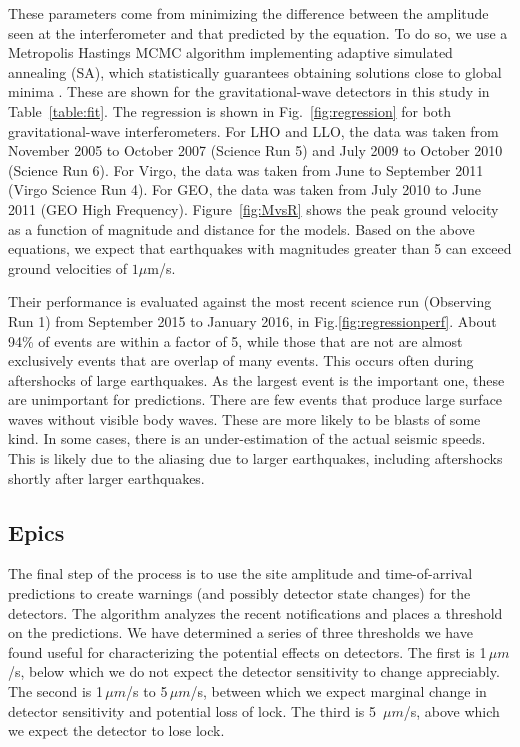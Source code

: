 \documentclass[reprint, prl, aps, showpacs]{revtex4-1}
\begin{document}
These parameters come from minimizing the difference between the amplitude seen at the interferometer and that predicted by the equation. 
To do so, we use a Metropolis Hastings MCMC algorithm implementing adaptive simulated annealing (SA), which statistically guarantees obtaining solutions close to global minima \cite{KiGe1983,In2000}.
These are shown for the gravitational-wave detectors in this study in Table~\ref{table:fit}. The regression is shown in Fig.~\ref{fig:regression} for both gravitational-wave interferometers. 
For LHO and LLO, the data was taken from November 2005 to October 2007 (Science Run 5) and July 2009 to October 2010 (Science Run 6).
For Virgo, the data was taken from June to September 2011 (Virgo Science Run 4).
For GEO, the data was taken from July 2010 to June 2011 (GEO High Frequency).
Figure~\ref{fig:MvsR} shows the peak ground velocity as a function of magnitude and distance for the models. Based on the above equations, we expect that earthquakes with magnitudes greater than 5 can exceed ground velocities of $1 \mu$m/s.

Their performance is evaluated against the most recent science run (Observing Run 1) from September 2015 to January 2016, in Fig.\ref{fig:regressionperf}. About 94\% of events are within a factor of 5, while those that are not are almost exclusively events that are overlap of many events. This occurs often during aftershocks of large earthquakes. As the largest event is the important one, these are unimportant for predictions. There are few events that produce large surface waves without visible body waves. These are more likely to be blasts of some kind.
In some cases, there is an under-estimation of the actual seismic speeds.
This is likely due to the aliasing due to larger earthquakes, including aftershocks shortly after larger earthquakes.

\subsection{Epics}

The final step of the process is to use the site amplitude and time-of-arrival predictions to create warnings (and possibly detector state changes) for the detectors.
The algorithm analyzes the recent notifications and places a threshold on the predictions.
We have determined a series of three thresholds we have found useful for characterizing the potential effects on detectors.
The first is 1\,$\mu m$/s, below which we do not expect the detector sensitivity to change appreciably.
The second is 1\,$\mu m$/s to 5\,$\mu m$/s, between which we expect marginal change in detector sensitivity and potential loss of lock.
The third is 5 \,$\mu m$/s, above which we expect the detector to lose lock.
\end{document}
